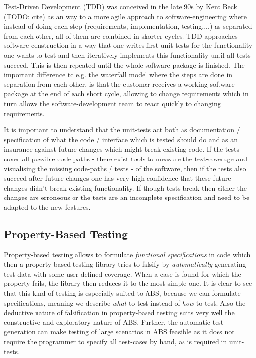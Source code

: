 Test-Driven Development (TDD) was conceived in the late 90s by Kent Beck (TODO: cite) as an way to a more agile approach to software-engineering where instead of doing each step (requirements, implementation, testing,...) as separated from each other, all of them are combined in shorter cycles. TDD approaches software construction in a way that one writes first unit-tests for the functionality one wants to test and then iteratively implements this functionality until all tests succeed. This is then repeated until the whole software package is finished. The important difference to e.g. the waterfall model where the steps are done in separation from each other, is that the customer receives a working software package at the end of each short cycle, allowing to change requirements which in turn allows the software-development team to react quickly to changing requirements.

It is important to understand that the unit-tests act both as documentation / specification of what the code / interface which is tested should do and as an insurance against future changes which might break existing code. If the tests cover all possible code paths - there exist tools to measure the test-coverage and visualising the missing code-paths / tests - of the software, then if the tests also succeed after future changes one has very high confidence that these future changes didn't break existing functionality. If though tests break then either the changes are erroneous or the tests are an incomplete specification and need to be adapted to the new features.

\subsection{Property-Based Testing}
Property-based testing allows to formulate \textit{functional specifications} in code which then a property-based testing library tries to falsify by \textit{automatically} generating test-data with some user-defined coverage. When a case is found for which the property fails, the library then reduces it to the most simple one. It is clear to see that this kind of testing is especially suited to ABS, because we can formulate specifications, meaning we describe \textit{what} to test instead of \textit{how} to test. Also the deductive nature of falsification in property-based testing suits very well the constructive and exploratory nature of ABS. Further, the automatic test-generation can make testing of large scenarios in ABS feasible as it does not require the programmer to specify all test-cases by hand, as is required in unit-tests.

